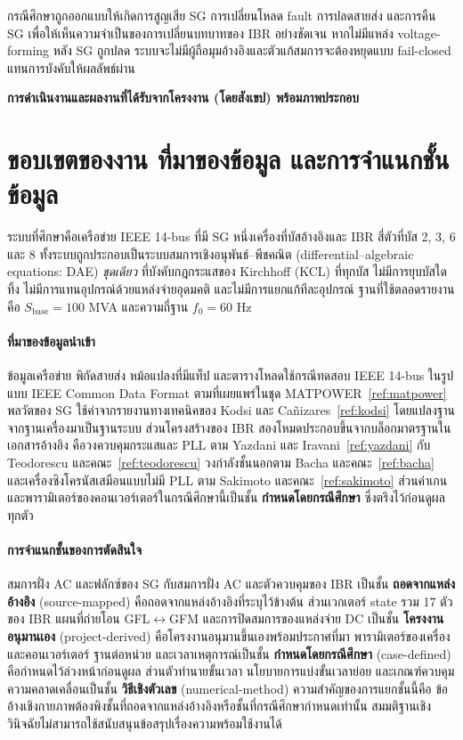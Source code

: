 \documentclass[12pt,a4paper]{article}
\newcommand{\templateheading}[1]{%
  \par\addvspace{0.85em}\noindent
  {\fontsize{19}{21}\selectfont\bfseries #1}\par
  \vspace{0.10em}\noindent{\color{academicblue}\rule{\textwidth}{0.9pt}}\par
  \vspace{0.30em}}
\newcommand{\class}[1]{\textbf{\textup{#1}}}
\begin{document}
กรณีศึกษาถูกออกแบบให้เกิดการสูญเสีย SG การเปลี่ยนโหลด fault การปลดสายส่ง และการคืน SG เพื่อให้เห็นความจำเป็นของการเปลี่ยนบทบาทของ IBR อย่างชัดเจน หากไม่มีแหล่ง voltage-forming หลัง SG ถูกปลด ระบบจะไม่มีผู้ถือมุมอ้างอิงและตัวแก้สมการจะต้องหยุดแบบ fail-closed แทนการบังคับให้ผลลัพธ์ผ่าน

\templateheading{การดำเนินงานและผลงานที่ได้รับจากโครงงาน (โดยสังเขป) พร้อมภาพประกอบ}
\section{ขอบเขตของงาน ที่มาของข้อมูล และการจำแนกชั้นข้อมูล}
ระบบที่ศึกษาคือเครือข่าย IEEE 14-bus ที่มี SG หนึ่งเครื่องที่บัสอ้างอิงและ IBR สี่ตัวที่บัส 2, 3, 6 และ 8 ทั้งระบบถูกประกอบเป็นระบบสมการเชิงอนุพันธ์--พีชคณิต (differential--algebraic equations: DAE) \emph{ชุดเดียว} ที่บังคับกฎกระแสของ Kirchhoff (KCL) ที่ทุกบัส ไม่มีการยุบบัสใดทิ้ง ไม่มีการแทนอุปกรณ์ด้วยแหล่งจ่ายอุดมคติ และไม่มีการแยกแก้ทีละอุปกรณ์ ฐานที่ใช้ตลอดรายงานคือ $S_{\mathrm{base}}=100$ MVA และความถี่ฐาน $f_0=60$ Hz

\paragraph{ที่มาของข้อมูลนำเข้า}
ข้อมูลเครือข่าย พิกัดสายส่ง หม้อแปลงที่มีแท็ป และตารางโหลดใช้กรณีทดสอบ IEEE 14-bus ในรูปแบบ IEEE Common Data Format ตามที่เผยแพร่ในชุด MATPOWER~\ref{ref:matpower} พลวัตของ SG ใช้ค่าจากรายงานทางเทคนิคของ Kodsi และ Ca\~{n}izares~\ref{ref:kodsi} โดยแปลงฐานจากฐานเครื่องมาเป็นฐานระบบ ส่วนโครงสร้างของ IBR สองโหมดประกอบขึ้นจากบล็อกมาตรฐานในเอกสารอ้างอิง คือวงควบคุมกระแสและ PLL ตาม Yazdani และ Iravani~\ref{ref:yazdani} กับ Teodorescu และคณะ~\ref{ref:teodorescu} วงกำลังชั้นนอกตาม Bacha และคณะ~\ref{ref:bacha} และเครื่องซิงโครนัสเสมือนแบบไม่มี PLL ตาม Sakimoto และคณะ~\ref{ref:sakimoto} ส่วนค่าเกนและพารามิเตอร์ของคอนเวอร์เตอร์ในกรณีศึกษานี้เป็นชั้น \class{กำหนดโดยกรณีศึกษา} ซึ่งตรึงไว้ก่อนดูผลทุกตัว

\paragraph{การจำแนกชั้นของการตัดสินใจ}
สมการฝั่ง AC และฟลักซ์ของ SG กับสมการฝั่ง AC และตัวควบคุมของ IBR เป็นชั้น \class{ถอดจากแหล่งอ้างอิง} (source-mapped) คือถอดจากแหล่งอ้างอิงที่ระบุไว้ข้างต้น ส่วนเวกเตอร์ state รวม 17 ตัวของ IBR แผนที่ถ่ายโอน GFL$\leftrightarrow$GFM และการปิดสมการของแหล่งจ่าย DC เป็นชั้น \class{โครงงานอนุมานเอง} (project-derived) คือโครงงานอนุมานขึ้นเองพร้อมประกาศที่มา พารามิเตอร์ของเครื่องและคอนเวอร์เตอร์ ฐานต่อหน่วย และเวลาเหตุการณ์เป็นชั้น \class{กำหนดโดยกรณีศึกษา} (case-defined) คือกำหนดไว้ล่วงหน้าก่อนดูผล ส่วนตัวทำนายขั้นเวลา นโยบายการแบ่งขั้นเวลาย่อย และเกณฑ์ควบคุมความคลาดเคลื่อนเป็นชั้น \class{วิธีเชิงตัวเลข} (numerical-method) ความสำคัญของการแยกชั้นนี้คือ ข้ออ้างเชิงกายภาพต้องพิงชั้นที่ถอดจากแหล่งอ้างอิงหรือชั้นที่กรณีศึกษากำหนดเท่านั้น สมมติฐานเชิงวินิจฉัยไม่สามารถใช้สนับสนุนข้อสรุปเรื่องความพร้อมใช้งานได้
\end{document}
